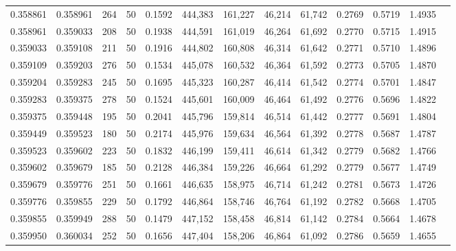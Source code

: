 \begin{tabular}{rrrrrrrrrrrrr}
0.358861 & 0.358961 &   264 &  50 &                                     0.1592 & 444,383 & 161,227 &  46,214 &  61,742 & 0.2769 & 0.5719 & 1.4935 \\
0.358961 & 0.359033 &   208 &  50 &                                     0.1938 & 444,591 & 161,019 &  46,264 &  61,692 & 0.2770 & 0.5715 & 1.4915 \\
0.359033 & 0.359108 &   211 &  50 &                                     0.1916 & 444,802 & 160,808 &  46,314 &  61,642 & 0.2771 & 0.5710 & 1.4896 \\
0.359109 & 0.359203 &   276 &  50 &                                     0.1534 & 445,078 & 160,532 &  46,364 &  61,592 & 0.2773 & 0.5705 & 1.4870 \\
0.359204 & 0.359283 &   245 &  50 &                                     0.1695 & 445,323 & 160,287 &  46,414 &  61,542 & 0.2774 & 0.5701 & 1.4847 \\
0.359283 & 0.359375 &   278 &  50 &                                     0.1524 & 445,601 & 160,009 &  46,464 &  61,492 & 0.2776 & 0.5696 & 1.4822 \\
0.359375 & 0.359448 &   195 &  50 &                                     0.2041 & 445,796 & 159,814 &  46,514 &  61,442 & 0.2777 & 0.5691 & 1.4804 \\
0.359449 & 0.359523 &   180 &  50 &                                     0.2174 & 445,976 & 159,634 &  46,564 &  61,392 & 0.2778 & 0.5687 & 1.4787 \\
0.359523 & 0.359602 &   223 &  50 &                                     0.1832 & 446,199 & 159,411 &  46,614 &  61,342 & 0.2779 & 0.5682 & 1.4766 \\
0.359602 & 0.359679 &   185 &  50 &                                     0.2128 & 446,384 & 159,226 &  46,664 &  61,292 & 0.2779 & 0.5677 & 1.4749 \\
0.359679 & 0.359776 &   251 &  50 &                                     0.1661 & 446,635 & 158,975 &  46,714 &  61,242 & 0.2781 & 0.5673 & 1.4726 \\
0.359776 & 0.359855 &   229 &  50 &                                     0.1792 & 446,864 & 158,746 &  46,764 &  61,192 & 0.2782 & 0.5668 & 1.4705 \\
0.359855 & 0.359949 &   288 &  50 &                                     0.1479 & 447,152 & 158,458 &  46,814 &  61,142 & 0.2784 & 0.5664 & 1.4678 \\
0.359950 & 0.360034 &   252 &  50 &                                     0.1656 & 447,404 & 158,206 &  46,864 &  61,092 & 0.2786 & 0.5659 & 1.4655 \\

\end{tabular}
